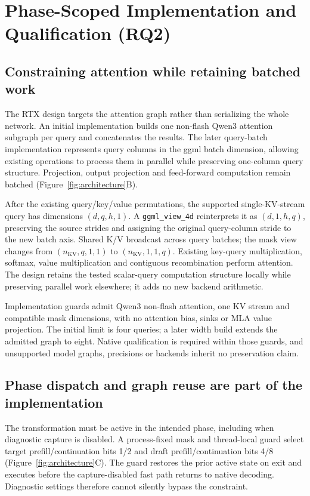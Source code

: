 \section{Phase-Scoped Implementation and Qualification (RQ2)}
\label{sec:repair}
\subsection{Constraining attention while retaining batched work}
The RTX design targets the attention graph rather than serializing the whole network. An initial implementation builds one non-flash Qwen3 attention subgraph per query and concatenates the results. The later query-batch implementation represents query columns in the ggml batch dimension, allowing existing operations to process them in parallel while preserving one-column query structure. Projection, output projection and feed-forward computation remain batched (Figure~\ref{fig:architecture}B).

After the existing query/key/value permutations, the supported single-KV-stream query has dimensions $(d,q,h,1)$. A \texttt{ggml\_view\_4d} reinterprets it as $(d,1,h,q)$, preserving the source strides and assigning the original query-column stride to the new batch axis. Shared K/V broadcast across query batches; the mask view changes from $(n_{\mathrm{KV}},q,1,1)$ to $(n_{\mathrm{KV}},1,1,q)$. Existing key-query multiplication, softmax, value multiplication and contiguous recombination perform attention. The design retains the tested scalar-query computation structure locally while preserving parallel work elsewhere; it adds no new backend arithmetic.

Implementation guards admit Qwen3 non-flash attention, one KV stream and compatible mask dimensions, with no attention bias, sinks or MLA value projection. The initial limit is four queries; a later width build extends the admitted graph to eight. Native qualification is required within those guards, and unsupported model graphs, precisions or backends inherit no preservation claim.

\subsection{Phase dispatch and graph reuse are part of the implementation}
The transformation must be active in the intended phase, including when diagnostic capture is disabled. A process-fixed mask and thread-local guard select target prefill/continuation bits 1/2 and draft prefill/continuation bits 4/8 (Figure~\ref{fig:architecture}C). The guard restores the prior active state on exit and executes before the capture-disabled fast path returns to native decoding. Diagnostic settings therefore cannot silently bypass the constraint.

